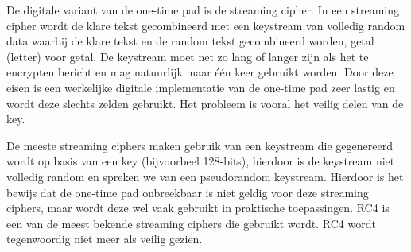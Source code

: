 De digitale variant van de one-time pad is de streaming cipher. In een streaming cipher wordt de klare tekst gecombineerd met een keystream van volledig random data waarbij de klare tekst en de random tekst gecombineerd worden, getal (letter) voor getal. De keystream moet net zo lang of langer zijn als het te encrypten bericht en mag natuurlijk maar \'e\'en keer gebruikt worden. Door deze eisen is een werkelijke digitale implementatie van de one-time pad zeer lastig en wordt deze slechts zelden gebruikt. Het probleem is vooral het veilig delen van de key.

De meeste streaming ciphers maken gebruik van een keystream die gegenereerd wordt op basis van een key (bijvoorbeel 128-bits), hierdoor is de keystream niet volledig random en spreken we van een pseudorandom keystream. Hierdoor is het bewijs dat de one-time pad onbreekbaar is niet geldig voor deze streaming ciphers, maar wordt deze wel vaak gebruikt in praktische toepassingen. RC4 is een van de meest bekende streaming ciphers die gebruikt wordt. RC4 wordt tegenwoordig niet meer als veilig gezien.
